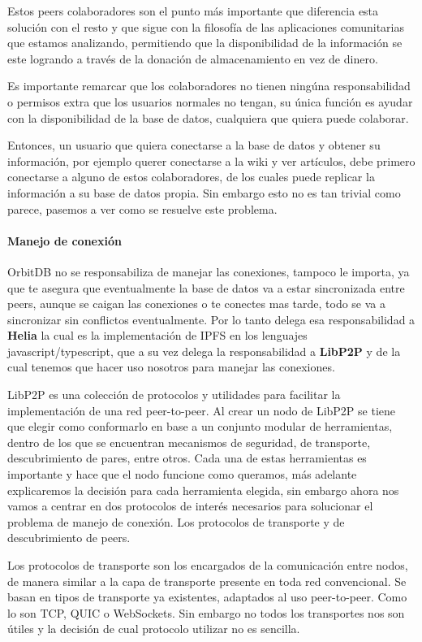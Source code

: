Estos peers colaboradores son el punto más importante que diferencia esta solución con el resto y que sigue con la filosofía de las aplicaciones comunitarias que estamos analizando, permitiendo que la disponibilidad de la información se este logrando a través de la donación de almacenamiento en vez de dinero.

Es importante remarcar que los colaboradores no tienen ningúna responsabilidad o permisos extra que los usuarios normales no tengan, su única función es ayudar con la disponibilidad de la base de datos, cualquiera que quiera puede colaborar.

Entonces, un usuario que quiera conectarse a la base de datos y obtener su información, por ejemplo querer conectarse a la wiki y ver artículos, debe primero conectarse a alguno de estos colaboradores, de los cuales puede replicar la información a su base de datos propia. Sin embargo esto no es tan trivial como parece, pasemos a ver como se resuelve este problema.

\paragraph{Manejo de conexión}

OrbitDB no se responsabiliza de manejar las conexiones, tampoco le importa, ya que te asegura que eventualmente la base de datos va a estar sincronizada entre peers, aunque se caigan las conexiones o te conectes mas tarde, todo se va a sincronizar sin conflictos eventualmente. Por lo tanto delega esa responsabilidad a \textbf{Helia}\cite{helia} la cual es la implementación de IPFS en los lenguajes javascript/typescript, que a su vez delega la responsabilidad a \textbf{LibP2P}\cite{libp2p} y de la cual tenemos que hacer uso nosotros para manejar las conexiones.

LibP2P es una colección de protocolos y utilidades para facilitar la implementación de una red peer-to-peer. Al crear un nodo de LibP2P se tiene que elegir como conformarlo en base a un conjunto modular de herramientas, dentro de los que se encuentran mecanismos de seguridad, de transporte, descubrimiento de pares, entre otros. Cada una de estas herramientas es importante y hace que el nodo funcione como queramos, más adelante explicaremos la decisión para cada herramienta elegida, sin embargo ahora nos vamos a centrar en dos protocolos de interés necesarios para solucionar el problema de manejo de conexión. Los protocolos de transporte y de descubrimiento de peers.

Los protocolos de transporte son los encargados de la comunicación entre nodos, de manera similar a la capa de transporte presente en toda red convencional. Se basan en tipos de transporte ya existentes, adaptados al uso peer-to-peer. Como lo son TCP, QUIC o WebSockets. Sin embargo no todos los transportes nos son útiles y la decisión de cual protocolo utilizar no es sencilla.


